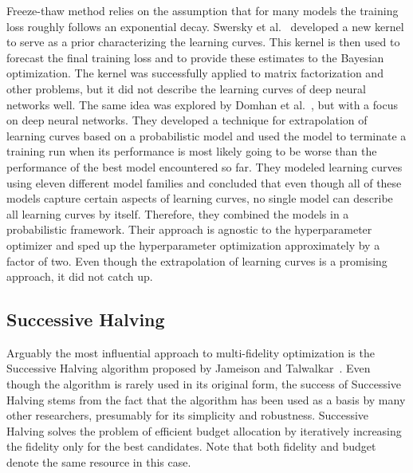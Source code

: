 Freeze-thaw method relies on the assumption that for many models the training loss roughly follows an exponential decay. Swersky et al.~\cite{swersky2014freeze} developed a new kernel to serve as a prior characterizing the learning curves. This kernel is then used to forecast the final training loss and to provide these estimates to the Bayesian optimization. The kernel was successfully applied to matrix factorization and other problems, but it did not describe the learning curves of deep neural networks well. The same idea was explored by Domhan et al.~\cite{domhan2015speeding}, but with a focus on deep neural networks. They developed a technique for extrapolation of learning curves based on a probabilistic model and used the model to terminate a training run when its performance is most likely going to be worse than the performance of the best model encountered so far. They modeled learning curves using eleven different model families and concluded that even though all of these models capture certain aspects of learning curves, no single model can describe all learning curves by itself. Therefore, they combined the models in a probabilistic framework. Their approach is agnostic to the hyperparameter optimizer and sped up the hyperparameter optimization approximately by a factor of two. Even though the extrapolation of learning curves is a promising approach, it did not catch up.

\subsection{Successive Halving}
 Arguably the most influential approach to multi-fidelity optimization is the Successive Halving algorithm proposed by Jameison and Talwalkar~\cite{jamieson16}. Even though the algorithm is rarely used in its original form, the success of Successive Halving stems from the fact that the algorithm has been used as a basis by many other researchers, presumably for its simplicity and robustness. Successive Halving solves the problem of efficient budget allocation by iteratively increasing the fidelity only for the best candidates. Note that both fidelity and budget denote the same resource in this case.

